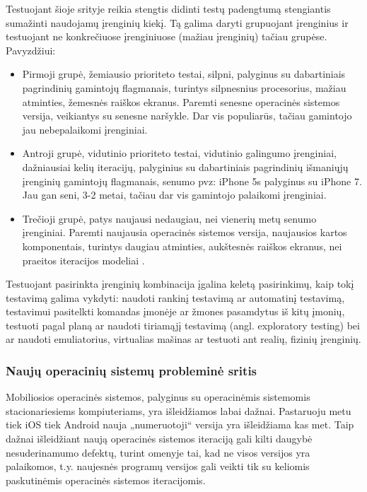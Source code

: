 \documentclass{VUMIFPSkursinis}
\begin{document}
Testuojant šioje srityje reikia stengtis didinti testų padengtumą stengiantis sumažinti naudojamų įrenginių kiekį. Tą galima daryti grupuojant įrenginius ir testuojant ne konkrečiuose įrenginiuose (mažiau įrenginių) tačiau grupėse. Pavyzdžiui:

\begin{itemize}
   \item Pirmoji grupė, žemiausio prioriteto testai, silpni, palyginus su dabartiniais pagrindinių gamintojų flagmanais, turintys silpnesnius procesorius, mažiau atminties, žemesnės raiškos ekranus. Paremti senesne operacinės sistemos versija, veikiantys su senesne naršykle. Dar vis populiarūs, tačiau gamintojo jau nebepalaikomi įrenginiai.

   \item Antroji grupė, vidutinio prioriteto testai, vidutinio galingumo įrenginiai, dažniausiai kelių iteracijų, palyginius su dabartiniais pagrindinių išmaniųjų įrenginių gamintojų flagmanais, senumo pvz: iPhone 5s palyginus su iPhone 7. Jau gan seni, 3-2 metai, tačiau dar vis gamintojo palaikomi įrenginiai.

   \item Trečioji grupė, patys naujausi nedaugiau, nei vienerių metų senumo įrenginiai. Paremti naujausia operacinės sistemos versija, naujausios kartos komponentais, turintys daugiau atminties, aukštesnės raiškos ekranus, nei praeitos iteracijos modeliai \cite{6496451}.
\end{itemize}
\bigskip
Testuojant pasirinkta įrenginių kombinacija įgalina keletą pasirinkimų, kaip tokį testavimą galima vykdyti: naudoti rankinį testavimą ar automatinį testavimą, testavimui pasitelkti komandas įmonėje ar žmones pasamdytus iš kitų įmonių, testuoti pagal planą ar naudoti tiriamąjį testavimą (angl. exploratory testing) bei ar naudoti emuliatorius, virtualias mašinas ar testuoti ant realių, fizinių įrenginių.

\subsubsection{Naujų operacinių sistemų probleminė sritis}
Mobiliosios operacinės sistemos, palyginus su operacinėmis sistemomis stacionariesiems kompiuteriams, yra išleidžiamos labai dažnai. Pastaruoju metu tiek iOS tiek Android nauja „numeruotoji“ versija yra išleidžiama kas met. Taip dažnai išleidžiant naują operacinės sistemos iteraciją gali kilti daugybė nesuderinamumo defektų, turint omenyje tai, kad ne visos versijos yra palaikomos, t.y. naujesnės programų versijos gali veikti tik su keliomis paskutinėmis operacinės sistemos iteracijomis.
\end{document}
